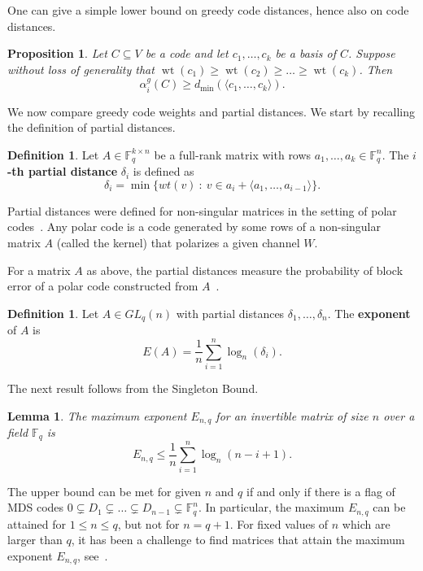 \documentclass[12pt]{amsart}
\numberwithin{equation}{section}
\DeclareMathOperator{\wt}{wt}
\newtheorem{proposition}[theorem]{Proposition}
\newtheorem{lemma}[theorem]{Lemma}
\theoremstyle{definition}
\newtheorem{definition}[theorem]{Definition}
\newcommand{\FF}{\mathbb{F}}
\begin{document}
One can give a simple lower bound on greedy code distances, hence also on code distances. 

\begin{proposition}
Let $C\subseteq V$ be a code and let $c_1,\ldots,c_k$ be a basis of $C$. Suppose without loss of generality that $\wt(c_1)\geq\wt(c_2)\geq\ldots\geq\wt(c_k)$. Then $$\alpha_i^g(C)\geq d_{\min}(\langle c_1,\ldots,c_k\rangle).$$
\end{proposition}

We now compare greedy code weights and partial distances. We start by recalling the definition of partial distances.

\begin{definition}
Let $A\in\mathbb{F}_q^{k\times n}$ be a full-rank matrix with rows $a_1,\ldots,a_k\in\FF_q^n$. The {\bf $i$-th partial distance} $\delta_i$ is defined as
$$\delta_i=\min\{wt(v)\ :\ v\in a_i+\langle a_1,\ldots, a_{i-1}\rangle\}.$$
\end{definition}

Partial distances were defined for non-singular matrices in the setting of polar codes~\cite{MT10, KSR10}. Any polar code is a code generated by some rows of a non-singular matrix $A$ (called the kernel) that polarizes a given channel $W$. 

For a matrix $A$ as above, the partial distances measure the probability of block error of a polar code constructed from $A$~\cite{AM14}.

\begin{definition}\rm
Let $A\in GL_q(n)$ with partial distances $\delta_1,\ldots, \delta_n$. The {\bf exponent} of $A$ is 
$$E(A)=\frac{1}{n}\sum_{i=1}^n \log_n(\delta_i).$$
\end{definition}

The next result follows from the Singleton Bound.

\begin{lemma}
The maximum exponent $E_{n,q}$ for an invertible matrix of size $n$ over a field $\FF_q$ is
$$E_{n,q}\leq \frac{1}{n}\sum_{i=1}^n \log_n(n-i+1).$$
\end{lemma}

The upper bound can be met for given $n$ and $q$ if and only if there is a flag of MDS codes $0\subsetneq D_1\subsetneq\ldots\subsetneq D_{n-1}\subsetneq\mathbb{F}_q^n$. In particular, the maximum $E_{n,q}$ can be attained for $1\leq n\leq q$, but not for $n=q+1$. For fixed values of $n$ which are larger than $q$, it has been a challenge to find matrices that attain the maximum exponent $E_{n,q}$, see~\cite{LLK15}.
\end{document}
